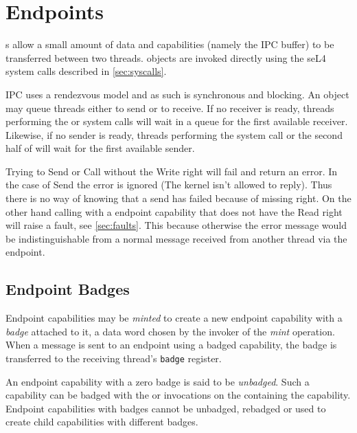\section{Endpoints}

s allow a small amount
of data and capabilities (namely the IPC buffer) to be transferred between two
threads.  objects are invoked directly using the seL4 system calls
described in \autoref{sec:syscalls}. 

IPC  uses a rendezvous model and as such is
synchronous and blocking. An  object  may queue
threads either to send or to receive. If no receiver is ready, threads
performing the  or 
system calls will wait in a queue for the first available receiver. Likewise, if
no sender is ready, threads performing the 
system call or the second half of 
will wait for the first available sender.

Trying to Send or Call without the Write right will fail and return an error. In
the case of Send the error is ignored (The kernel isn't allowed to reply). Thus
there is no way of knowing that a send has failed because of missing right.
On the other hand calling  with a endpoint capability that
does not have the Read right will raise a fault, see \autoref{sec:faults}. This
because otherwise the error message would be indistinguishable from a normal
message received from another thread via the endpoint.

\subsection{Endpoint Badges\label{s:ep-badge}}
\label{sec:ep-badges}

Endpoint capabilities may be \emph{minted} to
create a new endpoint capability with a \emph{badge} attached to it, a data
word chosen by the invoker of the \emph{mint} operation. When a message is sent to an endpoint using a badged
capability, the badge is transferred to the receiving thread's
\texttt{badge} register.

An endpoint capability with a zero badge is said to be \emph{unbadged}.
Such a capability can be badged with the  or 
invocations on the  containing the capability. Endpoint
capabilities with badges cannot be unbadged, rebadged or used to create
child capabilities with different badges.

